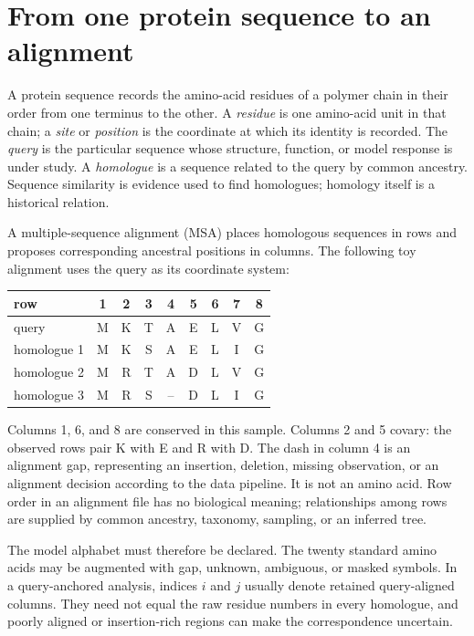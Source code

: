 \section{From one protein sequence to an alignment}
\label{sec:book-sequence-msa-primer}

A protein sequence records the amino-acid residues of a polymer chain in their order from one
terminus to the other.  A \emph{residue} is one amino-acid unit in that chain; a \emph{site} or
\emph{position} is the coordinate at which its identity is recorded.  The \emph{query} is the
particular sequence whose structure, function, or model response is under study.  A
\emph{homologue} is a sequence related to the query by common ancestry.  Sequence similarity is
evidence used to find homologues; homology itself is a historical relation.

A multiple-sequence alignment (MSA) places homologous sequences in rows and proposes
corresponding ancestral positions in columns.  The following toy alignment uses the query as its
coordinate system:
\begin{center}
\small
\setlength{\tabcolsep}{5pt}
\begin{tabular}{@{}lcccccccc@{}}
\toprule
row & 1 & 2 & 3 & 4 & 5 & 6 & 7 & 8 \\
\midrule
query       & M & K & T & A & E & L & V & G \\
homologue 1 & M & K & S & A & E & L & I & G \\
homologue 2 & M & R & T & A & D & L & V & G \\
homologue 3 & M & R & S & -- & D & L & I & G \\
\bottomrule
\end{tabular}
\end{center}
Columns 1, 6, and 8 are conserved in this sample.  Columns 2 and 5 covary: the observed rows pair
K with E and R with D.  The dash in column 4 is an alignment gap, representing an insertion,
deletion, missing observation, or an alignment decision according to the data pipeline.  It is not
an amino acid.  Row order in an alignment file has no biological meaning; relationships among
rows are supplied by common ancestry, taxonomy, sampling, or an inferred tree.

The model alphabet must therefore be declared.  The twenty standard amino acids may be augmented
with gap, unknown, ambiguous, or masked symbols.  In a query-anchored analysis, indices $i$ and
$j$ usually denote retained query-aligned columns.  They need not equal the raw residue numbers in
every homologue, and poorly aligned or insertion-rich regions can make the correspondence
uncertain.

